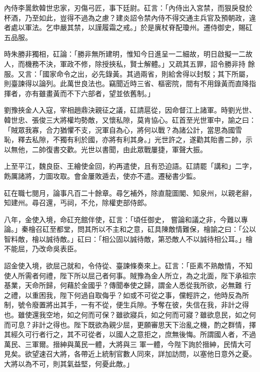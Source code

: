 \begin{pinyinscope}
 內侍李暠飲韓世忠家，刃傷弓匠，事下廷尉。矼言：「內侍出入宮禁，而狠戾發於杯酒，乃至如此，豈得不過為之慮？建炎詔令禁內侍不得交通主兵官及預朝政，違者處以軍法。乞申嚴其禁，以謹履霜之戒。」於是廙杖脊配瓊州。遷侍御史，賜矼五品服。



 時朱勝非獨相，矼論：「勝非無所建明，惟知今日進呈一二細故，明日啟擬一二故人，而機務不決，軍政不修，除授挾私，賢士解體。」又疏其五罪，詔令勝非持
 餘服。又言：「國家命令之出，必先錄黃。其過兩省，則給舍得以封駁；其下所屬，則臺諫得以論列。此萬世良法也。竊聞近時三省、樞密院，間有不用錄黃而直降指揮者，亦有雖畫黃而不下六部者，望並依舊制。」



 劉豫挾金人入寇，宰相趙鼎決親征之議，矼請扈從，因命督江上諸軍。時劉光世、韓世忠、張俊三大將權均勢敵，又懷私隙，莫肯協心。矼首至光世軍中，諭之曰：「賊眾我寡，合力猶懼不支，況軍自為心，將何以戰？為諸公計，當思為國雪
 恥，釋去私隙，不獨有利於國，亦將有利其身。」光世許之，遂勸其貽書二帥，示以無他，二帥復書交歡。光世以書聞，由此眾戰屢捷，軍聲大振。



 上至平江，魏良臣、王繪使金回，約再遣使，且有恐迫語。矼請罷「講和」二字，飭厲諸將，力圖攻取。會金屢敗遁去，使亦不遣。遷秘書少監。



 矼在職七閱月，論事凡百二十餘章。尋乞補外，除直龍圖閣、知泉州，以親老辭，知建州。尋召還，丐祠，不允，除權吏部侍郎。



 八年，金使入境，命矼充館伴使，矼言：「頃任御史，
 嘗論和議之非，今難以專論。」秦檜召矼至都堂，問其所以不主和之意，矼具陳敵情難保，檜諭之曰：「公以智料敵，檜以誠待敵。」矼曰：「相公固以誠待敵，第恐敵人不以誠待相公耳。」檜不能屈，乃改命吳表臣。



 詔金使入境，欲屈己就和，令侍從、臺諫條奏來上。矼言：「臣素不熟敵情，不知使人所需者何禮，陛下所以屈己者何事。賊豫為金人所立，為之北面，陛下承祖宗基業，天命所歸，何藉於金國乎？傳聞奉使之歸，謂金人悉從我所欲，必無難
 行之禮，以重困我，陛下何過自取侮乎？如或不可從之事，儻輕許之，他時反為所制，號令廢置將出其手，一有不從，便生兵隙。予奪在彼，失信在我，非計之得也。雖使還我空地，如之何而可保？雖欲寢兵，如之何而可寢？雖欲息民，如之何而可息？非計之得也。陛下既欲為親少屈，更願審思天下治亂之機，酌之群情，擇其經久可行者行之，其不可從者，以國人之意拒之，庶無後悔。所謂國人者，不過萬民、三軍爾。搢紳與萬民一體，大將與三
 軍一體，今陛下詢於搢紳，民情大可見矣。欲望速召大將，各帶近上統制官數人同來，詳加訪問，以塞他日意外之憂。大將以為不可，則其氣益堅，何憂此敵。」




\end{pinyinscope}
